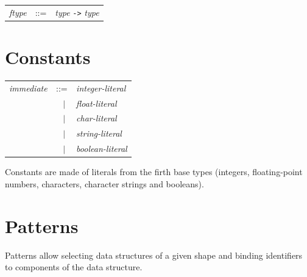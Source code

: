 \documentclass[11pt,titlepage,twoside]{report}
\newcommand{\alt}{\;|\;}
\newcommand{\term}[1]{{\tt #1}}
\newcommand{\nterm}[1]{{\em #1}}
\begin{document}
\begin{center}
  \begin{tabular}{lcl}
\nterm{ftype} & ::=        & \nterm{type} \term{->} \nterm{type}
  \end{tabular}
\end{center}


\section{Constants}

\begin{center}
\begin{tabular}{lcl}
\nterm{immediate} & ::=           & \nterm{integer-literal} \\
                  & $\;\;\alt$    & \nterm{float-literal} \\
                  & $\;\;\alt$    & \nterm{char-literal} \\
                  & $\;\;\alt$    & \nterm{string-literal} \\
                  & $\;\;\alt$    & \nterm{boolean-literal} \\
\end{tabular}
\end{center}
Constants are made of literals from the firth base types (integers,
floating-point numbers, characters, character strings and booleans).

\section{Patterns}

Patterns allow selecting data structures of a given shape and binding
identifiers to components of the data structure.
\end{document}
